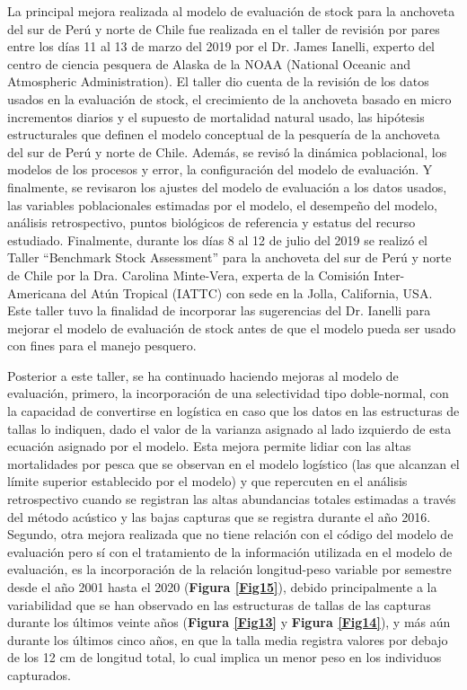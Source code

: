\documentclass[letter,11pt]{article}
\begin{document}
La principal mejora realizada al modelo de evaluaci\'on de stock para la
anchoveta del sur de Per\'u y norte de Chile fue realizada en el taller de
revisi\'on por pares entre los d\'ias 11 al 13 de marzo del 2019 por el
Dr. James Ianelli, experto del centro de ciencia pesquera de Alaska de
la NOAA (National Oceanic and Atmospheric Administration). El taller dio
cuenta de la revisi\'on de los datos usados en la evaluaci\'on de stock, el
crecimiento de la anchoveta basado en micro incrementos diarios y el
supuesto de mortalidad natural usado, las hip\'otesis estructurales que
definen el modelo conceptual de la pesquer\'ia de la anchoveta del sur de
Per\'u y norte de Chile. Adem\'as, se revis\'o la din\'amica poblacional, los
modelos de los procesos y error, la configuraci\'on del modelo de
evaluaci\'on. Y finalmente, se revisaron los ajustes del modelo de
evaluaci\'on a los datos usados, las variables poblacionales estimadas por
el modelo, el desempe\~{n}o del modelo, an\'alisis retrospectivo, puntos
biol\'ogicos de referencia y estatus del recurso estudiado. Finalmente,
durante los d\'ias 8 al 12 de julio del 2019 se realiz\'o el Taller
\textquotedblleft Benchmark Stock Assessment\textquotedblright 
para la anchoveta del sur de Per\'u y norte de Chile
por la Dra. Carolina Minte-Vera, experta de la Comisi\'on
Inter-Americana del At\'un Tropical (IATTC) con sede en la Jolla,
California, USA. Este taller tuvo la finalidad de incorporar las
sugerencias del Dr. Ianelli para mejorar el modelo de evaluaci\'on de
stock antes de que el modelo pueda ser usado con fines para el manejo
pesquero.

Posterior a este taller, se ha continuado haciendo mejoras al modelo de
evaluaci\'on, primero, la incorporaci\'on de una selectividad tipo
doble-normal, con la capacidad de convertirse en log\'istica en caso que
los datos en las estructuras de tallas lo indiquen, dado el valor de la
varianza asignado al lado izquierdo de esta ecuaci\'on asignado por el
modelo. Esta mejora permite lidiar con las altas mortalidades por pesca
que se observan en el modelo log\'istico (las que alcanzan el l\'imite
superior establecido por el modelo) y que repercuten en el an\'alisis
retrospectivo cuando se registran las altas abundancias totales
estimadas a trav\'es del m\'etodo ac\'ustico y las bajas capturas que se
registra durante el a\~{n}o 2016. Segundo, otra mejora realizada que no
tiene relaci\'on con el c\'odigo del modelo de evaluaci\'on pero s\'i con el
tratamiento de la informaci\'on utilizada en el modelo de evaluaci\'on, es
la incorporaci\'on de la relaci\'on longitud-peso variable por semestre
desde el a\~{n}o 2001 hasta el 2020 (\textbf{Figura \ref{Fig15}}), debido
principalmente a la variabilidad que se han observado en las estructuras
de tallas de las capturas durante los \'ultimos veinte a\~{n}os
(\textbf{Figura \ref{Fig13}} y \textbf{Figura \ref{Fig14}}), y m\'as a\'un
durante los \'ultimos cinco a\~{n}os, en que la talla media registra valores
por debajo de los 12 cm de longitud total, lo cual implica un menor peso
en los individuos capturados.
\end{document}
